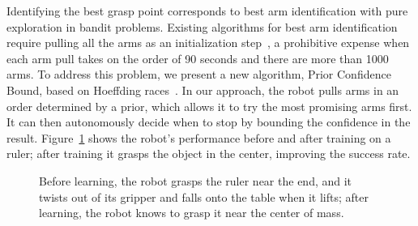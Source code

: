 \documentclass{article}
\newcommand{\algorithmDTxt}{Prior Confidence Bound\xspace}
\begin{document}
Identifying the best grasp point corresponds to best arm
identification with pure exploration in bandit problems.  Existing
algorithms for best arm identification require pulling all the arms as
an initialization step~\citep{mannor04, audibert10, chen14}, a
prohibitive expense when each arm pull takes on the order of 90
seconds and there are more than 1000 arms.  To address this problem,
we present a new algorithm, \algorithmDTxt, based on Hoeffding
races~\citep{maron93}. In our approach, the robot pulls arms in an order
determined by a prior, which allows it to try the most promising arms
first. It can then autonomously decide when to stop by bounding the
confidence in the result.  Figure~\ref{fig:ruler} shows the robot's
performance before and after training on a ruler; after training it
grasps the object in the center, improving the success rate.
\begin{figure}
%
\caption{Before learning, the robot grasps the ruler near the end, and it twists out of its gripper and falls onto the table when it lifts; after learning, the robot knows to grasp it near the center of mass.\label{fig:ruler}}
\end{figure}
\end{document}
